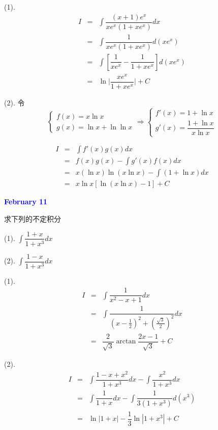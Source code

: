\begin{solution}

	(1). 
	\begin{eqnarray*}
		I & = & \int \dfrac{(x+1)e^{x}}{xe^{x}(1+xe^{x})}dx\\
		  & = & \int \dfrac{1}{xe^{x}(1+xe^{x})}d(xe^{x})\\
		  & = & \int \left[\dfrac{1}{xe^{x}}-\dfrac{1}{1+xe^{x}}\right]d(xe^{x})\\
		  & = & \ln \big|\dfrac{xe^{x}}{1+xe^{x}}\big| +C
	\end{eqnarray*}

	(2). 令 
	$$\begin{cases}
		f(x) = x\ln x \\ 
		g(x) = \ln x+\ln \ln x
	\end{cases}\Rightarrow 
	\begin{cases} 
		f'(x) = 1+\ln x\\
		g'(x) = \dfrac{1+\ln x}{x\ln x}
	\end{cases}$$
	
	\begin{eqnarray*}
		I & = & \int f'(x)g(x)dx\\
		  & = & f(x)g(x) - \int g'(x)f(x)dx\\
		  & = & x(\ln x)\ln(x\ln x) - \int (1+\ln x)dx\\
		  & = & x\ln x\left[\ln(x\ln x) - 1 \right] + C
	\end{eqnarray*}
\end{solution}

\textcolor{blue}{\textbf{February 11}}
\begin{example}[][Exam: 28.2.7]
	求下列的不定积分

(1). $\displaystyle{\int \dfrac{1+x}{1+x^{3}}dx}$

(2). $\displaystyle{\int \dfrac{1-x}{1+x^{3}}dx}$
\end{example}

\begin{solution}

	(1). 
	\begin{eqnarray*}
		I & = & \int \dfrac{1}{x^{2}-x+1}dx\\
		  & = & \int \dfrac{1}{(x-\frac{1}{2})^{2}+(\frac{\sqrt{3}}{2})^{2}}dx\\
		  & = & \dfrac{2}{\sqrt{3}}\arctan \dfrac{2x-1}{\sqrt{3}} +C
	\end{eqnarray*}

	(2). 
	\begin{eqnarray*}
		I & = & \int\dfrac{1-x+x^{2}}{1+x^{3}}dx - \int\dfrac{x^{2}}{1+x^{3}}dx\\
		  & = & \int\dfrac{1}{1+x}dx - \int\dfrac{1}{3(1+x^{3})}d(x^{3})\\
		  & = & \ln |1+x| - \dfrac{1}{3}\ln|1+x^{3}| + C
	\end{eqnarray*}
\end{solution}

